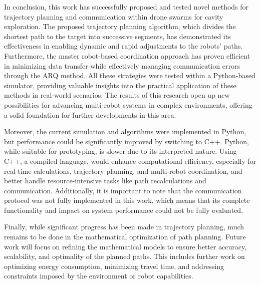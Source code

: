 \documentclass[../main.tex]{subfiles}
\begin{document}
In conclusion, this work has successfully proposed and tested novel methods for trajectory planning and communication within drone swarms for cavity exploration. The proposed trajectory planning algorithm, which divides the shortest path to the target into successive segments, has demonstrated its effectiveness in enabling dynamic and rapid adjustments to the robots' paths. Furthermore, the master robot-based coordination approach has proven efficient in minimizing data transfer while effectively managing communication errors through the ARQ method. All these strategies were tested within a Python-based simulator, providing valuable insights into the practical application of these methods in real-world scenarios. The results of this research open up new possibilities for advancing multi-robot systems in complex environments, offering a solid foundation for further developments in this area.

\vspace{1em}

Moreover, the current simulation and algorithms were implemented in Python, but performance could be significantly improved by switching to C++. Python, while suitable for prototyping, is slower due to its interpreted nature. Using C++, a compiled language, would enhance computational efficiency, especially for real-time calculations, trajectory planning, and multi-robot coordination, and better handle resource-intensive tasks like path recalculations and communication. Additionally, it is important to note that the communication protocol was not fully implemented in this work, which means that its complete functionality and impact on system performance could not be fully evaluated. 

\vspace{1em}

Finally, while significant progress has been made in trajectory planning, much remains to be done in the mathematical optimization of path planning. Future work will focus on refining the mathematical models to ensure better accuracy, scalability, and optimality of the planned paths. This includes further work on optimizing energy consumption, minimizing travel time, and addressing constraints imposed by the environment or robot capabilities.
\end{document}
